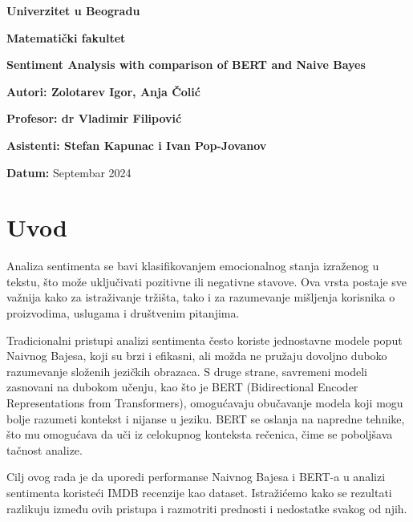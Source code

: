 \documentclass{article}
\begin{document}
\begin{center}
        \large
        \textbf{Univerzitet u Beogradu}
        
        \vspace{0.5cm}
        
        \textbf{Matematički fakultet}
        
        \vspace{4cm}
        
        \textbf{Sentiment Analysis with comparison of BERT and Naive Bayes}

        \vspace{3 cm}

        \textbf{Autori: Zolotarev Igor, Anja Čolić}
        \vspace{1 cm}
        
        \textbf{Profesor: dr Vladimir Filipović} 
        \vspace{1 cm}
        
        \textbf{Asistenti: Stefan Kapunac i Ivan Pop-Jovanov}

        \vspace{4 cm}
        
        \textbf{Datum:} Septembar 2024
        
    \end{center}



\newpage
\tableofcontents
\newpage
\section{Uvod}
Analiza sentimenta se bavi klasifikovanjem emocionalnog stanja izraženog u tekstu, što može uključivati pozitivne ili negativne stavove. Ova vrsta postaje sve važnija kako za istraživanje tržišta, tako i za razumevanje mišljenja korisnika o proizvodima, uslugama i društvenim pitanjima.

Tradicionalni pristupi analizi sentimenta često koriste jednostavne modele poput Naivnog Bajesa, koji su brzi i efikasni, ali možda ne pružaju dovoljno duboko razumevanje složenih jezičkih obrazaca. S druge strane, savremeni modeli zasnovani na dubokom učenju, kao što je BERT (Bidirectional Encoder Representations from Transformers), omogućavaju obučavanje modela koji mogu bolje razumeti kontekst i nijanse u jeziku. BERT se oslanja na napredne tehnike, što mu omogućava da uči iz celokupnog konteksta rečenica, čime se poboljšava tačnost analize.

Cilj ovog rada je da uporedi performanse Naivnog Bajesa i BERT-a u analizi sentimenta koristeći IMDB recenzije kao dataset. Istražićemo kako se rezultati razlikuju između ovih pristupa i razmotriti prednosti i nedostatke svakog od njih. 
\end{document}
